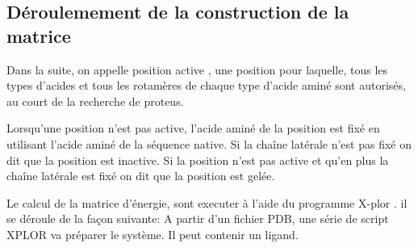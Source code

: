 \subsection{Déroulemement de la construction de la matrice}
\label{sub:matrix}

Dans la suite, on appelle \og position active \fg, une position pour laquelle, tous les types d'acides et tous les rotamères de chaque type d'acide aminé sont autorisés, au court de la recherche de proteus.

Lorsqu'une position n'est pas active, l'acide aminé de la position est fixé en utilisant l'acide aminé de la séquence native. Si la chaîne latérale n'est pas fixé on dit que la position est \og inactive\fg. Si la position n'est pas active et qu'en plus la chaîne latérale est fixé on dit que la position est gelée.

Le calcul de la matrice d'énergie, sont executer à l'aide du programme X-plor \cite{Brünger92}. il se déroule de la façon suivante:
A partir d'un fichier PDB, une série de script XPLOR va préparer le système. Il peut contenir un ligand.

